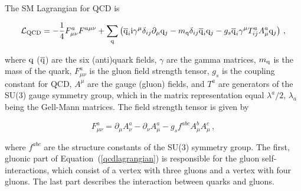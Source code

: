 The SM Lagrangian for QCD is~\cite{dissertori}
% 
\begin{linenomath*}
\begin{equation}
\label{qcdlagrangian}
\mathcal{L}_\text{QCD} =
- \frac{1}{4} F^a_{\mu\nu} F^{a\mu\nu} 
+ \sum_\mathrm{q} \left( 
    \overline{\mathrm{q}}_i \mathrm{i} \gamma^\mu \delta_{ij} \partial_\mu \mathrm{q}_j
    - m_\mathrm{q} \delta_{ij} \overline{\mathrm{q}}_i \mathrm{q}_j
    - g_s \overline{\mathrm{q}}_i \gamma^\mu T_{ij}^a A_\mu^a \mathrm{q}_j
    \right)
\,,
\end{equation}
\end{linenomath*}
% 
where $\mathrm{q}$ ($\overline{\mathrm{q}}$) are the six (anti)quark fields, $\gamma$ are the gamma matrices, $m_\mathrm{q}$ is the mass of the quark, $F^a_{\mu\nu}$ is the gluon field strength tensor, $g_s$ is the coupling constant for QCD, $A^\mu$ are the gauge (gluon) fields, and $T^a$ are generators of the SU(3) gauge symmetry group, which in the matrix representation equal $\lambda^a/2$, $\lambda_a$ being the Gell-Mann matrices.
% 
The field strength tensor is given by
% 
\begin{linenomath*}
\begin{equation}
F^a_{\mu\nu}
    = \partial_\mu A^a_\nu - \partial_\nu A^a_\mu - g_s f^{abc} A_\mu^b A_\mu^c
\,,
\end{equation}
\end{linenomath*}
% 
where $f^{abc}$ are the structure constants of the SU(3) symmetry group.
% 
The first, gluonic part of Equation~(\ref{qcdlagrangian}) is responsible for the gluon self-interactions, which consist of a vertex with three gluons and a vertex with four gluons.
% 
The last part describes the interaction between quarks and gluons.


